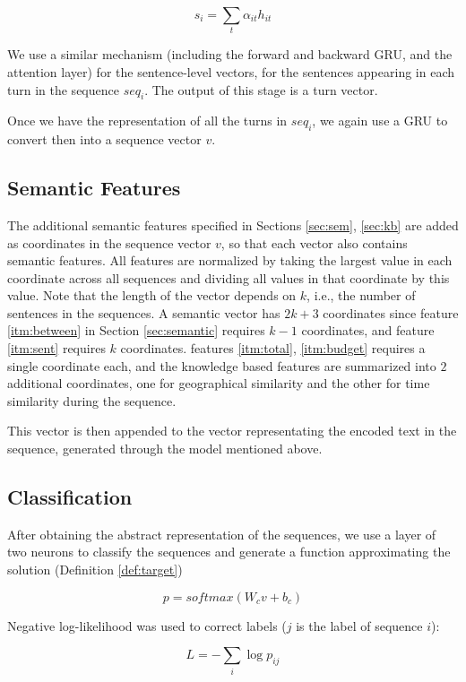 \begin{equation*}
	s_i = \sum_{t} \alpha_{it} h_{it}
\end{equation*}

We use a similar mechanism (including the forward and backward 
GRU, and the attention layer) for the sentence-level vectors, 
for the sentences appearing in each turn in the sequence $seq_i$. 
The output of this stage is a turn vector. 

Once we have the representation of all the turns in $seq_i$, 
we again use a GRU to convert then into a sequence vector $v$. 

\subsection{Semantic Features}
The additional semantic features specified 
in Sections \ref{sec:sem}, \ref{sec:kb} 
are added as coordinates in the sequence vector $v$, so that 
each vector also contains semantic features. 
All features are normalized by taking the largest 
value in each coordinate across all sequences and dividing 
all values in that coordinate by this value.  
Note that the length of the vector depends on $k$, 
i.e., the number of sentences in the sequences. 
A semantic vector has $2k+3$ coordinates since feature \ref{itm:between} in Section \ref{sec:semantic} requires $k-1$ coordinates, and 
feature \ref{itm:sent} requires $k$ coordinates. 
features \ref{itm:total}, \ref{itm:budget} requires a single coordinate each, 
and the knowledge based features are summarized into $2$ additional coordinates, 
one for geographical similarity and the other for time similarity during the sequence. 

This vector is then appended to the vector representating the encoded text in the sequence, generated through the model mentioned above. 


\subsection{Classification}
After obtaining the abstract representation of the sequences, 
we use a layer of two neurons to classify the sequences and 
generate a function approximating the solution (Definition \ref{def:target}) 

\begin{equation*}
	p = softmax(W_c v + b_c)
\end{equation*}

Negative log-likelihood was used to correct labels ($j$ is the label of sequence $i$): 

\begin{equation*}
	L = - \sum_{i} \log{p_{ij}}
\end{equation*}


